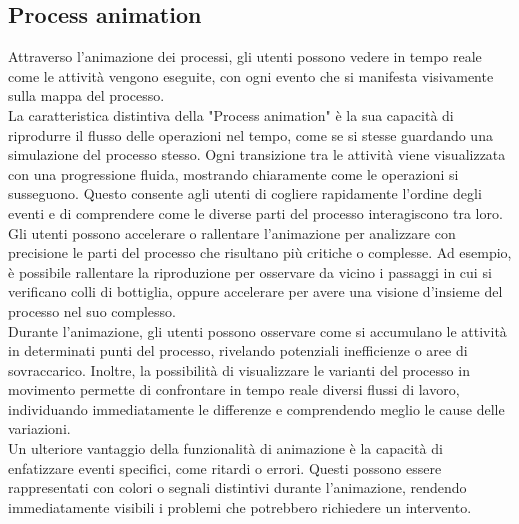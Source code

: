 \documentclass{article}
\begin{document}
\subsection{Process animation}
Attraverso l'animazione dei processi, gli utenti possono vedere in tempo reale come le attività vengono eseguite, con ogni evento che si manifesta visivamente sulla mappa del processo.\\
La caratteristica distintiva della "Process animation" è la sua capacità di riprodurre il flusso delle operazioni nel tempo, come se si stesse guardando una simulazione del processo stesso. Ogni transizione tra le attività viene visualizzata con una progressione fluida, mostrando chiaramente come le operazioni si susseguono. Questo consente agli utenti di cogliere rapidamente l’ordine degli eventi e di comprendere come le diverse parti del processo interagiscono tra loro.\\
Gli utenti possono accelerare o rallentare l’animazione per analizzare con precisione le parti del processo che risultano più critiche o complesse. Ad esempio, è possibile rallentare la riproduzione per osservare da vicino i passaggi in cui si verificano colli di bottiglia, oppure accelerare per avere una visione d'insieme del processo nel suo complesso.\\
Durante l’animazione, gli utenti possono osservare come si accumulano le attività in determinati punti del processo, rivelando potenziali inefficienze o aree di sovraccarico. Inoltre, la possibilità di visualizzare le varianti del processo in movimento permette di confrontare in tempo reale diversi flussi di lavoro, individuando immediatamente le differenze e comprendendo meglio le cause delle variazioni.\\
Un ulteriore vantaggio della funzionalità di animazione è la capacità di enfatizzare eventi specifici, come ritardi o errori. Questi possono essere rappresentati con colori o segnali distintivi durante l'animazione, rendendo immediatamente visibili i problemi che potrebbero richiedere un intervento.\\
\end{document}
